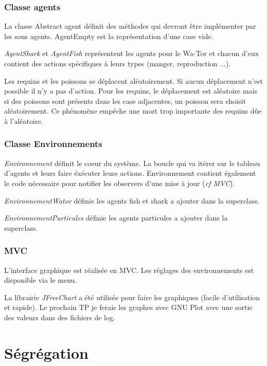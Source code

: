 \documentclass[a4paper,12pt]{report}
\begin{document}
\subsubsection*{Classe agents}

La classe Abstract agent définit des méthodes qui devront être implémenter par les sous agents. AgentEmpty est la représentation d'une case vide.

\textit{AgentShark} et \textit{AgentFish} représentent les agents pour le Wa-Tor et chacun d'eux contient des actions spécifiques à leurs types (manger, reproduction ...).

Les requins et les poissons se déplacent aléatoirement. Si aucun déplacement n'est possible il n'y a pas d'action. Pour les requins, le déplacement est aléatoire mais si des poissons sont présents dans les case adjacentes, un poisson sera choisit aléatoirement. Ce phénomène empêche une mort trop importante des requins dûe à l'aléatoire.

\subsubsection*{Classe Environnements}

\textit{Environnement} définit le coeur du système. La boucle qui va itérer sur le tableau d'agents et leurs faire éxécuter leurs actions. Environnement contient également le code nécessaire pour notifier les observers d'une mise à jour (\textit{cf MVC}).

\textit{EnvironnementWator} définie les agents fish et shark a ajouter dans la superclass.

\textit{EnvironnementParticules} définie les agents particules a ajouter dans la superclass.

\subsubsection*{MVC}

L'interface graphique est réalisée en MVC. Les réglages des environnements est disponible via le menu.

La librairie \textit{JFreeChart} a été utilisée pour faire les graphiques (facile d'utilisation et rapide). Le prochain TP je ferais les graphes avec GNU Plot avec une sortie des valeurs dans des fichiers de log.
\newpage


\section*{Ségrégation}
\end{document}
